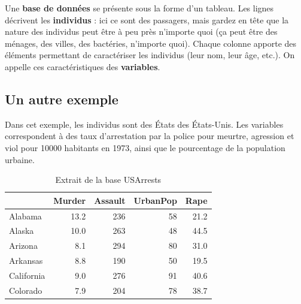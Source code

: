 \documentclass[
]{book}
\begin{document}
\begin{table}

\caption{\label{tab:titanic}Extrait de la base de données des passagers du Titanic}
\centering
{}
\end{table}

Une \textbf{base de données} se présente sous la forme d'un tableau. Les lignes décrivent les \textbf{individus} : ici ce sont des passagers, mais gardez en tête que la nature des individus peut être à peu près n'importe quoi (ça peut être des ménages, des villes, des bactéries, n'importe quoi). Chaque colonne apporte des éléments permettant de caractériser les individus (leur nom, leur âge, etc.). On appelle ces caractéristiques des \textbf{variables}.

\hypertarget{un-autre-exemple}{%
\subsection{Un autre exemple}\label{un-autre-exemple}}

Dans cet exemple, les individus sont des États des États-Unis. Les variables correspondent à des taux d'arrestation par la police pour meurtre, agression et viol pour 10000 habitants en 1973, ainsi que le pourcentage de la population urbaine.

\begin{table}

\caption{\label{tab:unnamed-chunk-2}Extrait de la base USArrests}
\centering
\begin{tabular}[t]{l|r|r|r|r}
\hline
  & Murder & Assault & UrbanPop & Rape\\
\hline
Alabama & 13.2 & 236 & 58 & 21.2\\
\hline
Alaska & 10.0 & 263 & 48 & 44.5\\
\hline
Arizona & 8.1 & 294 & 80 & 31.0\\
\hline
Arkansas & 8.8 & 190 & 50 & 19.5\\
\hline
California & 9.0 & 276 & 91 & 40.6\\
\hline
Colorado & 7.9 & 204 & 78 & 38.7\\
\hline
\end{tabular}
\end{table}
\end{document}
